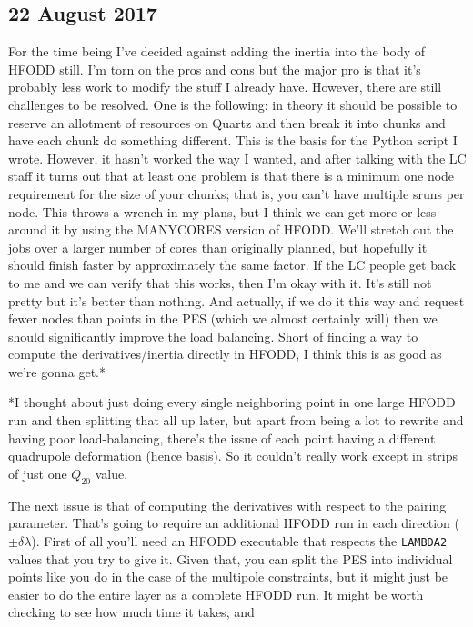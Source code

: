 \documentclass[]{report}
\begin{document}
\subsection*{22 August 2017}
For the time being I've decided against adding the inertia into the body of HFODD still. I'm torn on the pros and cons but the major pro is that it's probably less work to modify the stuff I already have. However, there are still challenges to be resolved. One is the following: in theory it should be possible to reserve an allotment of resources on Quartz and then break it into chunks and have each chunk do something different. This is the basis for the Python script I wrote. However, it hasn't worked the way I wanted, and after talking with the LC staff it turns out that at least one problem is that there is a minimum one node requirement for the size of your chunks; that is, you can't have multiple sruns per node. This throws a wrench in my plans, but I think we can get more or less around it by using the MANYCORES version of HFODD. We'll stretch out the jobs over a larger number of cores than originally planned, but hopefully it should finish faster by approximately the same factor. If the LC people get back to me and we can verify that this works, then I'm okay with it. It's still not pretty but it's better than nothing. And actually, if we do it this way and request fewer nodes than points in the PES (which we almost certainly will) then we should significantly improve the load balancing. Short of finding a way to compute the derivatives/inertia directly in HFODD, I think this is as good as we're gonna get.*

*I thought about just doing every single neighboring point in one large HFODD run and then splitting that all up later, but apart from being a lot to rewrite and having poor load-balancing, there's the issue of each point having a different quadrupole deformation (hence basis). So it couldn't really work except in strips of just one $Q_{20}$ value.

The next issue is that of computing the derivatives with respect to the pairing parameter. That's going to require an additional HFODD run in each direction ($\pm\delta\lambda$). First of all you'll need an HFODD executable that respects the \texttt{LAMBDA2} values that you try to give it. Given that, you can split the PES into individual points like you do in the case of the multipole constraints, but it might just be easier to do the entire layer as a complete HFODD run. It might be worth checking to see how much time it takes, and 
\end{document}
